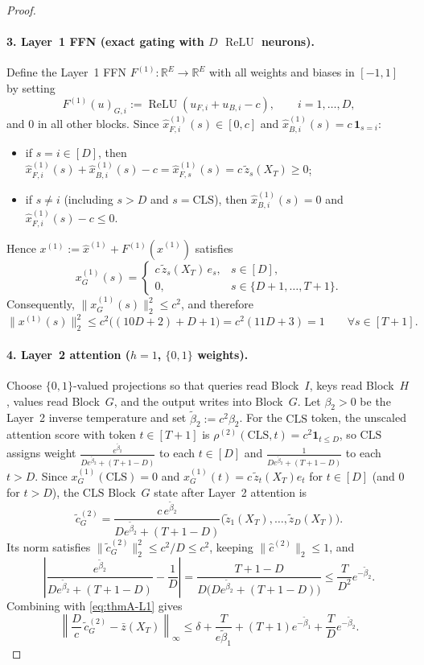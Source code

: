 \documentclass[11pt]{article}
\theoremstyle{plain}
\theoremstyle{definition}
\theoremstyle{remark}
\DeclareMathOperator{\ReLU}{ReLU}
\newcommand{\R}{\mathbb{R}}
\newcommand{\1}{\mathbf{1}}
\newcommand{\CLS}{\mathrm{CLS}}
\begin{document}
\begin{proof}
\paragraph{3. Layer~1 FFN (exact gating with $D$ $\ReLU$ neurons).}
Define the Layer~1 FFN $F^{(1)} : \R^E \to \R^E$ with all weights and biases in $[-1,1]$ by setting
\[
F^{(1)}(u)_{G,i} := \ReLU(u_{F,i} + u_{B,i} - c), \qquad i = 1, \dots, D,
\]
and $0$ in all other blocks. Since $\hat{x}^{(1)}_{F,i}(s) \in [0,c]$ and $\hat{x}^{(1)}_{B,i}(s) = c\,\1_{s = i}$:
\begin{itemize}[leftmargin=2em,itemsep=1pt]
    \item if $s = i \in [D]$, then $\hat{x}^{(1)}_{F,i}(s) + \hat{x}^{(1)}_{B,i}(s) - c = \hat{x}^{(1)}_{F,s}(s) = c\,\tilde{z}_s(X_T) \ge 0$;
    \item if $s \neq i$ (including $s > D$ and $s = \CLS$), then $\hat{x}^{(1)}_{B,i}(s) = 0$ and $\hat{x}^{(1)}_{F,i}(s) - c \le 0$.
\end{itemize}
Hence $x^{(1)} := \hat{x}^{(1)} + F^{(1)}(\hat{x}^{(1)})$ satisfies
\[
x^{(1)}_G(s) = \begin{cases}
c\,\tilde{z}_s(X_T)\, e_s, & s \in [D], \\
0, & s \in \{D+1, \dots, T+1\}.
\end{cases}
\]
Consequently, $\|x^{(1)}_G(s)\|_2^2 \le c^2$, and therefore
\[
\bigl\|x^{(1)}(s)\bigr\|_2^2 \le c^2\bigl((10D + 2) + D + 1\bigr) = c^2(11D + 3) = 1 \qquad \forall s \in [T+1].
\]

\paragraph{4. Layer~2 attention ($h = 1$, $\{0,1\}$ weights).}
Choose $\{0,1\}$-valued projections so that queries read Block~$I$, keys read Block~$H$, values read Block~$G$, and the output writes into Block~$G$. Let $\beta_2 > 0$ be the Layer~2 inverse temperature and set $\tilde{\beta}_2 := c^2 \beta_2$. For the $\CLS$ token, the unscaled attention score with token $t \in [T+1]$ is $\rho^{(2)}(\CLS, t) = c^2 \1_{t \le D}$, so $\CLS$ assigns weight $\frac{e^{\tilde{\beta}_2}}{D e^{\tilde{\beta}_2} + (T + 1 - D)}$ to each $t \in [D]$ and $\frac{1}{D e^{\tilde{\beta}_2} + (T + 1 - D)}$ to each $t > D$. Since $x^{(1)}_G(\CLS) = 0$ and $x^{(1)}_G(t) = c\,\tilde{z}_t(X_T)e_t$ for $t \in [D]$ (and $0$ for $t > D$), the $\CLS$ Block~$G$ state after Layer~2 attention is
\[
\tilde{c}^{(2)}_G = \frac{c\, e^{\tilde{\beta}_2}}{D e^{\tilde{\beta}_2} + (T + 1 - D)}\bigl(\tilde{z}_1(X_T), \dots, \tilde{z}_D(X_T)\bigr).
\]
Its norm satisfies $\|\tilde{c}^{(2)}_G\|_2^2 \le c^2/D \le c^2$, keeping $\|\hat{c}^{(2)}\|_2 \le 1$, and
\[
\left|\frac{e^{\tilde{\beta}_2}}{D e^{\tilde{\beta}_2} + (T + 1 - D)} - \frac{1}{D}\right|
= \frac{T + 1 - D}{D\bigl(D e^{\tilde{\beta}_2} + (T + 1 - D)\bigr)}
\le \frac{T}{D^2} e^{-\tilde{\beta}_2}.
\]
Combining with \eqref{eq:thmA-L1} gives
\[
\left\|\frac{D}{c}\,\tilde{c}^{(2)}_G - \bar{z}(X_T)\right\|_\infty
\le \delta + \frac{T}{e\tilde{\beta}_1} + (T + 1)e^{-\tilde{\beta}_1} + \frac{T}{D}e^{-\tilde{\beta}_2}.
\]


\end{proof}
\end{document}
